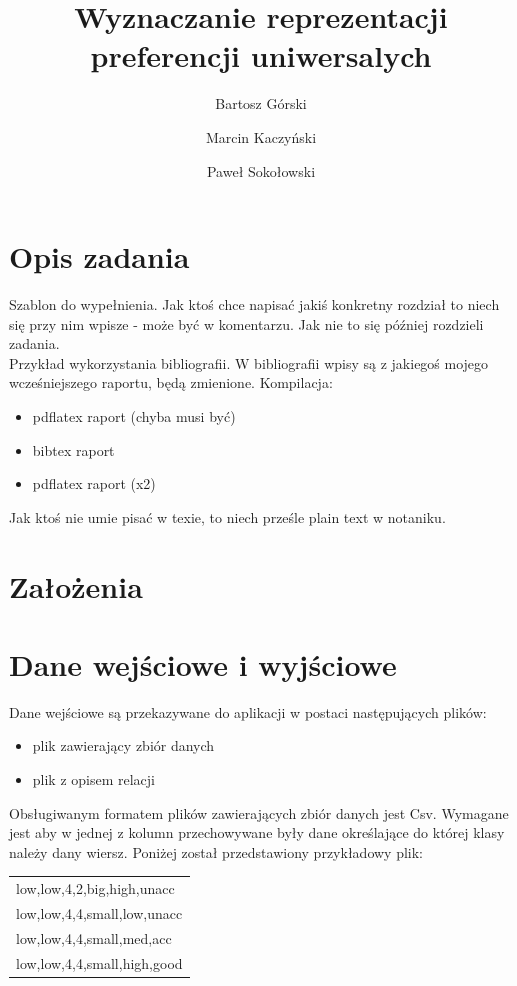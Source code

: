\documentclass[a4paper,12pt]{article}
\title{Wyznaczanie reprezentacji preferencji uniwersalych}
\author{Bartosz Górski \and Marcin Kaczyński \and Paweł Sokołowski}
\begin{document}
\maketitle

\section{Opis zadania} 

Szablon do wypełnienia. Jak ktoś chce napisać jakiś konkretny rozdział to niech się przy nim wpisze - może być w komentarzu. 
Jak nie to się później rozdzieli zadania.\\

Przykład wykorzystania bibliografii\cite{fst}. W bibliografii wpisy są z jakiegoś mojego wcześniejszego raportu, będą zmienione. Kompilacja:

\begin{itemize}
\item pdflatex raport (chyba musi być)
\item bibtex raport
\item pdflatex raport (x2)
\end{itemize}

Jak ktoś nie umie pisać w texie, to niech prześle plain text w notaniku.

\section{Założenia}
\section{Dane wejściowe i wyjściowe}
\label{opis_danych}
Dane wejściowe są przekazywane do aplikacji w postaci następujących plików:
\begin{itemize}
\item plik zawierający zbiór danych
\item plik z opisem relacji
\end{itemize}
Obsługiwanym formatem plików zawierających zbiór danych jest Csv. Wymagane jest aby w jednej z kolumn przechowywane były dane określające do której klasy należy dany wiersz. Poniżej został przedstawiony przykładowy plik: \\

\begin{tabular}{l}
low,low,4,2,big,high,unacc \\
low,low,4,4,small,low,unacc \\
low,low,4,4,small,med,acc \\
low,low,4,4,small,high,good \\
\end{tabular}
\\
\end{document}
